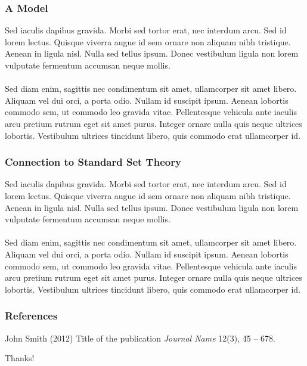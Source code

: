 \documentclass{beamer}
\begin{document}
\begin{frame}
    \frametitle{A Model}
    Sed iaculis dapibus gravida. Morbi sed tortor erat, nec interdum arcu. Sed id lorem lectus. Quisque viverra augue id sem ornare non aliquam nibh tristique. Aenean in ligula nisl. Nulla sed tellus ipsum. Donec vestibulum ligula non lorem vulputate fermentum accumsan neque mollis.\\~\\
    
    Sed diam enim, sagittis nec condimentum sit amet, ullamcorper sit amet libero. Aliquam vel dui orci, a porta odio. Nullam id suscipit ipsum. Aenean lobortis commodo sem, ut commodo leo gravida vitae. Pellentesque vehicula ante iaculis arcu pretium rutrum eget sit amet purus. Integer ornare nulla quis neque ultrices lobortis. Vestibulum ultrices tincidunt libero, quis commodo erat ullamcorper id.
\end{frame}
\begin{frame}
    \frametitle{Connection to Standard Set Theory}
    Sed iaculis dapibus gravida. Morbi sed tortor erat, nec interdum arcu. Sed id lorem lectus. Quisque viverra augue id sem ornare non aliquam nibh tristique. Aenean in ligula nisl. Nulla sed tellus ipsum. Donec vestibulum ligula non lorem vulputate fermentum accumsan neque mollis.\\~\\
    
    Sed diam enim, sagittis nec condimentum sit amet, ullamcorper sit amet libero. Aliquam vel dui orci, a porta odio. Nullam id suscipit ipsum. Aenean lobortis commodo sem, ut commodo leo gravida vitae. Pellentesque vehicula ante iaculis arcu pretium rutrum eget sit amet purus. Integer ornare nulla quis neque ultrices lobortis. Vestibulum ultrices tincidunt libero, quis commodo erat ullamcorper id.
\end{frame}

\begin{frame}
\frametitle{References}
\footnotesize{
\begin{thebibliography}{99}
     John Smith (2012)
    \newblock Title of the publication
    \newblock \emph{Journal Name} 12(3), 45 -- 678.
    \end{thebibliography}
}
\end{frame}

\begin{frame}
\Huge{\centerline{Thanks!}}
\end{frame}
\end{document}
